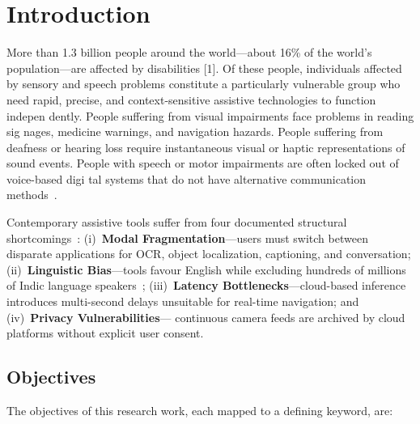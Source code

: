 \documentclass[pdflatex,sn-mathphys-num]{sn-jnl}
\theoremstyle{thmstyleone}%
\theoremstyle{thmstyletwo}%
\theoremstyle{thmstylethree}%
\begin{document}
\maketitle
\section{Introduction}\label{sec:intro}

More than 1.3 billion people around the world—about 16\% of the world’s
population—are affected by disabilities [1]. Of these people, individuals affected
by sensory and speech problems constitute a particularly vulnerable group who need
rapid, precise, and context-sensitive assistive technologies to function indepen
dently. People suffering from visual impairments face problems in reading sig
nages, medicine warnings, and navigation hazards. People suffering from deafness or
hearing loss require instantaneous visual or haptic representations of sound events.
People with speech or motor impairments are often locked out of voice-based digi
tal systems that do not have alternative communication methods~\cite{bigham2010vizwiz, w3c2023wcag}.

Contemporary assistive tools suffer from four documented structural
shortcomings~\cite{morris2020ai}: (i)~\textbf{Modal Fragmentation}---users must
switch between disparate applications for OCR, object localization, captioning,
and conversation; (ii)~\textbf{Linguistic Bias}---tools favour English while
excluding hundreds of millions of Indic language speakers~\cite{jawahar2021indicnlp};
(iii)~\textbf{Latency Bottlenecks}---cloud-based inference introduces multi-second
delays unsuitable for real-time navigation; and (iv)~\textbf{Privacy Vulnerabilities}---
continuous camera feeds are archived by cloud platforms without explicit user consent.

\subsection{Objectives}\label{subsec:objectives}

The objectives of this research work, each mapped to a defining keyword, are:
\end{document}
